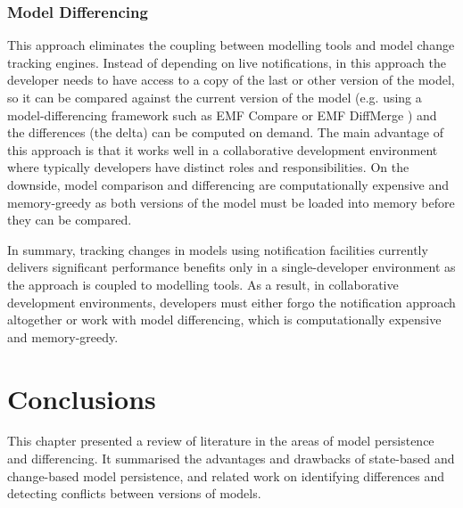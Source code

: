 \subsubsection{Model Differencing}
\label{sec:model_differencing}
This approach eliminates the coupling between modelling tools and model change tracking engines. Instead of depending on live notifications, in this approach the developer needs to have access to a copy of the last or other version of the model, so it can be compared against the current version of the model (e.g. using a model-differencing framework such as EMF Compare\cite{emfcompare2018developer} or EMF DiffMerge \cite{eclipse2019emfdiffmerge}) and the differences (the delta) can be computed on demand. The main advantage of this approach is that it works well in a collaborative development environment where typically developers have distinct roles and responsibilities. On the downside, model comparison and differencing are computationally expensive and memory-greedy as both versions of the model must be loaded into memory before they can be compared.

In summary, tracking changes in models using notification facilities currently delivers significant performance benefits only in a single-developer environment as the approach is coupled to modelling tools.
As a result, in collaborative development environments, developers must either forgo the notification approach altogether or work with model differencing, which is computationally expensive and memory-greedy.

\section{Conclusions}
\label{sec:conclusions_2}
This chapter presented a review of literature in the areas of model persistence and differencing. It summarised the advantages and drawbacks of state-based and change-based model persistence, and related work on identifying differences and detecting conflicts between versions of models.
